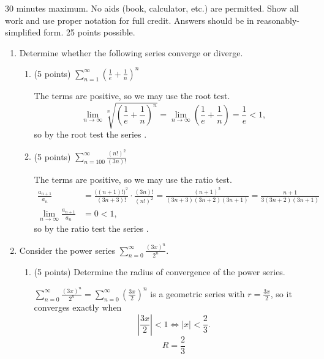 \documentclass[12pt]{article}
\newcommand{\ds}{\displaystyle}
\begin{document}
30 minutes maximum.  No aids (book, calculator, etc.) are permitted.
Show all work and use proper notation for full credit.  Answers should
be in reasonably-simplified form.  25 points possible.

\begin{enumerate}

\item Determine whether the following series converge or diverge.
  \begin{enumerate}
  \item (5 points) $\ds \sum_{n=1}^{\infty} \left( \frac{1}{e} + \frac{1}{n} \right)^n$
    \begin{solution}
      The terms are positive, so we may use the root test.
      \[
        \lim_{n\to\infty} \sqrt[n]{\left( \frac1e + \frac1n \right)^n}
        = \lim_{n\to\infty} \left( \frac1e + \frac1n \right) = \frac1e < 1,
      \]
      so by the root test the series .
    \end{solution}
    \vfill
    
  \item (5 points) $\ds \sum_{n=100}^{\infty} \frac{(n!)^2}{(3n)!}$
    \begin{solution}
      The terms are positive, so we may use the ratio test.
      \begin{align*}
        \frac{a_{n+1}}{a_n}
          &= \frac{\big((n+1)!\big)^2}{(3n+3)!} \cdot \frac{(3n)!}{(n!)^2}
           = \frac{(n+1)^2}{(3n+3)(3n+2)(3n+1)}
           = \frac{n+1}{3(3n+2)(3n+1)} \\[4pt]
        \lim_{n\to\infty} \frac{a_{n+1}}{a_n} &= 0 < 1,
      \end{align*}
      so by the ratio test the series .
    \end{solution}
    \vfill
    
  \end{enumerate}

  \newpage


\item Consider the power series
  $\ds \sum_{n=0}^{\infty} \frac{(3x)^n}{2^n}$.
  \begin{enumerate}
  \item (5 points) Determine the radius of convergence of the power series.
    \begin{solution}
      $\ds\sum_{n=0}^{\infty} \frac{(3x)^n}{2^n} = \sum_{n=0}^{\infty} \left( \frac{3x}{2} \right)^n$
      is a geometric series with $r = \frac{3x}{2}$, so it converges exactly when
      \[
        \left| \frac{3x}{2} \right| < 1 \iff |x| < \frac23.
      \]
      \[
        \boxed{R = \frac23}
      \]
    \end{solution}
    \vfill
    

\end{enumerate}
\end{enumerate}
\end{document}
